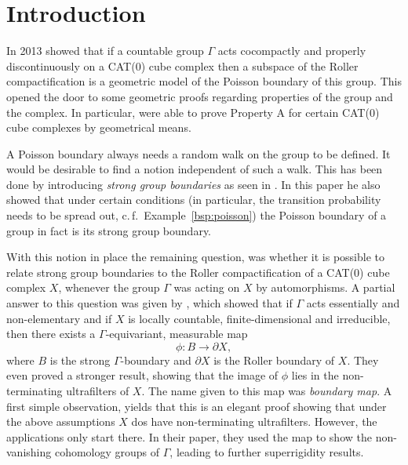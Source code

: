 \section{Introduction}
\label{sec:introduction}

In 2013 \textcite{MR3095714} showed that if a countable group \(\Gamma\) acts cocompactly and properly discontinuously on a CAT(0) cube complex then a subspace of the Roller compactification is a geometric model of the Poisson boundary of this group. This opened the door to some geometric proofs regarding properties of the group and the complex. In particular, \textcite{MR3095714} were able to prove Property A for certain CAT(0) cube complexes by geometrical means.

A Poisson boundary always needs a random walk on the group to be defined. It would be desirable to find a notion independent of such a walk. This has been done by introducing \emph{strong group boundaries} as seen in \textcite{MR2006560}. In this paper he also showed that under certain conditions (in particular, the transition probability needs to be spread out, c.\,f.\ Example~\ref{bsp:poisson}) the Poisson boundary of a group in fact is its strong group boundary.

With this notion in place the remaining question, was whether it is possible to relate strong group boundaries to the Roller compactification of a CAT(0) cube complex \(X\), whenever the group \(\Gamma\) was acting on \(X\) by automorphisms. A partial answer to this question was given by \textcite{MR3509968}, which showed that if \(\Gamma\) acts essentially and non-elementary and if \(X\) is locally countable, finite-dimensional and irreducible, then there exists a \(\Gamma\)-equivariant, measurable map
\[
  \phi\colon B \to \partial X,
\]
where \(B\) is the strong \(\Gamma\)-boundary and \(\partial X\) is the Roller boundary of \(X\). They even proved a stronger result, showing that the image of \(\phi\) lies in the non-terminating ultrafilters of \(X\). The name given to this map was \emph{boundary map}. A first simple observation, yields that this is an elegant proof showing that under the above assumptions \(X\) dos have non-terminating ultrafilters. However, the applications only start there. In their paper, they used the map to show the non-vanishing cohomology groups of \(\Gamma\), leading to further superrigidity results.

